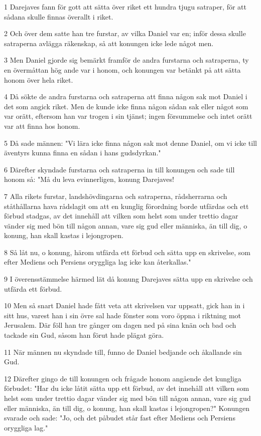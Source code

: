 \par 1 Darejaves fann för gott att sätta över riket ett hundra tjugu satraper, för att sådana skulle finnas överallt i riket.
\par 2 Och över dem satte han tre furstar, av vilka Daniel var en; inför dessa skulle satraperna avlägga räkenskap, så att konungen icke lede något men.
\par 3 Men Daniel gjorde sig bemärkt framför de andra furstarna och satraperna, ty en övermåttan hög ande var i honom, och konungen var betänkt på att sätta honom över hela riket.
\par 4 Då sökte de andra furstarna och satraperna att finna någon sak mot Daniel i det som angick riket. Men de kunde icke finna någon sådan sak eller något som var orätt, eftersom han var trogen i sin tjänst; ingen försummelse och intet orätt var att finna hos honom.
\par 5 Då sade männen: "Vi lära icke finna någon sak mot denne Daniel, om vi icke till äventyrs kunna finna en sådan i hans gudsdyrkan."
\par 6 Därefter skyndade furstarna och satraperna in till konungen och sade till honom så: "Må du leva evinnerligen, konung Darejaves!
\par 7 Alla rikets furstar, landshövdingarna och satraperna, rådsherrarna och ståthållarna hava rådslagit om att en kunglig förordning borde utfärdas och ett förbud stadgas, av det innehåll att vilken som helst som under trettio dagar vänder sig med bön till någon annan, vare sig gud eller människa, än till dig, o konung, han skall kastas i lejongropen.
\par 8 Så låt nu, o konung, härom utfärda ett förbud och sätta upp en skrivelse, som efter Mediens och Persiens oryggliga lag icke kan återkallas."
\par 9 I överensstämmelse härmed lät då konung Darejaves sätta upp en skrivelse och utfärda ett förbud.
\par 10 Men så snart Daniel hade fått veta att skrivelsen var uppsatt, gick han in i sitt hus, varest han i sin övre sal hade fönster som voro öppna i riktning mot Jerusalem. Där föll han tre gånger om dagen ned på sina knän och bad och tackade sin Gud, såsom han förut hade plägat göra.
\par 11 När männen nu skyndade till, funno de Daniel bedjande och åkallande sin Gud.
\par 12 Därefter gingo de till konungen och frågade honom angående det kungliga förbudet: "Har du icke låtit sätta upp ett förbud, av det innehåll att vilken som helst som under trettio dagar vänder sig med bön till någon annan, vare sig gud eller människa, än till dig, o konung, han skall kastas i lejongropen?" Konungen svarade och sade: "Jo, och det påbudet står fast efter Mediens och Persiens oryggliga lag."
